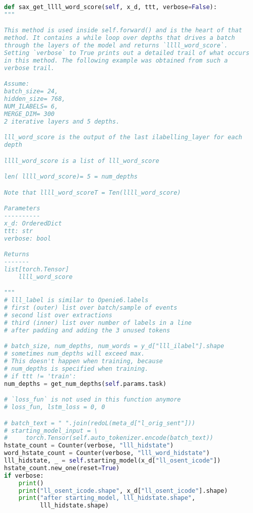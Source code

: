 \documentclass[12pt]{article}
\begin{document}
\begin{lstlisting}[language=Python]
def sax_get_llll_word_score(self, x_d, ttt, verbose=False):
"""

This method is used inside self.forward() and is the heart of that
method. It contains a while loop over depths that drives a batch
through the layers of the model and returns `llll_word_score`.
Setting `verbose` to True prints out a detailed trail of what occurs
in this method. The following example was obtained from such a
verbose trail.

Assume:
batch_size= 24,
hidden_size= 768,
NUM_ILABELS= 6,
MERGE_DIM= 300
2 iterative layers and 5 depths.

lll_word_score is the output of the last ilabelling_layer for each
depth

llll_word_score is a list of lll_word_score

len( llll_word_score)= 5 = num_depths

Note that llll_word_scoreT = Ten(llll_word_score)

Parameters
----------
x_d: OrderedDict
ttt: str
verbose: bool

Returns
-------
list[torch.Tensor]
    llll_word_score

"""
# lll_label is similar to Openie6.labels
# first (outer) list over batch/sample of events
# second list over extractions
# third (inner) list over number of labels in a line
# after padding and adding the 3 unused tokens

# batch_size, num_depths, num_words = y_d["lll_ilabel"].shape
# sometimes num_depths will exceed max.
# This doesn't happen when training, because
# num_depths is specified when training.
# if ttt != 'train':
num_depths = get_num_depths(self.params.task)

# `loss_fun` is not used in this function anymore
# loss_fun, lstm_loss = 0, 0

# batch_text = " ".join(redoL(meta_d["l_orig_sent"]))
# starting_model_input = \
#     torch.Tensor(self.auto_tokenizer.encode(batch_text))
hstate_count = Counter(verbose, "lll_hidstate")
word_hstate_count = Counter(verbose, "lll_word_hidstate")
lll_hidstate, _ = self.starting_model(x_d["ll_osent_icode"])
hstate_count.new_one(reset=True)
if verbose:
    print()
    print("ll_osent_icode.shape", x_d["ll_osent_icode"].shape)
    print("after starting_model, lll_hidstate.shape",
          lll_hidstate.shape)


\end{lstlisting}
\end{document}
